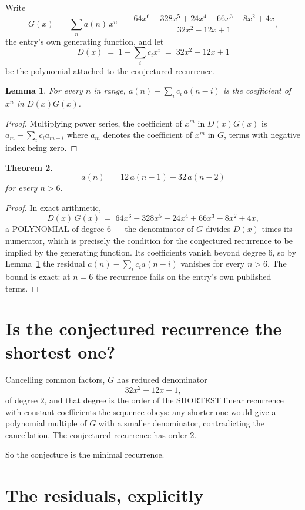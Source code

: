 \documentclass[11pt,a4paper]{article}
\theoremstyle{plain}
\newtheorem{theorem}{Theorem}
\newtheorem{lemma}[theorem]{Lemma}
\theoremstyle{definition}
\begin{document}
Write
\[
G(x)\;=\;\sum_{n}a(n)\,x^{n}\;=\;\frac{64 x^{6} - 328 x^{5} + 24 x^{4} + 66 x^{3} - 8 x^{2} + 4 x}{32 x^{2} - 12 x + 1},
\]
the entry's own generating function, and let
\[
D(x)\;=\;1-\sum_i c_i x^{i}\;=\;32 x^{2} - 12 x + 1
\]
be the polynomial attached to the conjectured recurrence.

\begin{lemma}\label{lem:key}
For every $n$ in range, $a(n)-\sum_i c_i\,a(n-i)$ is the coefficient of $x^{n}$ in
$D(x)G(x)$.
\end{lemma}

\begin{proof}
Multiplying power series, the coefficient of $x^{m}$ in $D(x)G(x)$ is
$a_m-\sum_i c_i a_{m-i}$ where $a_m$ denotes the coefficient of $x^{m}$ in $G$, terms with
negative index being zero.
\end{proof}

\begin{theorem}
\[
a(n)\;=\;12\,a(n-1) - 32\,a(n-2)
\]
for every $n>6$.
\end{theorem}

\begin{proof}
In exact arithmetic,
\[
D(x)\,G(x)\;=\;64 x^{6} - 328 x^{5} + 24 x^{4} + 66 x^{3} - 8 x^{2} + 4 x,
\]
a POLYNOMIAL of degree $6$ --- the denominator of $G$ divides $D(x)$ times its numerator,
which is precisely the condition for the conjectured recurrence to be implied by the
generating function. Its coefficients vanish beyond degree $6$, so by
Lemma~\ref{lem:key} the residual $a(n)-\sum_ic_ia(n-i)$ vanishes for every
$n>6$. The bound is exact: at $n=6$ the recurrence fails on the entry's own published terms.
\end{proof}

\section{Is the conjectured recurrence the shortest one?}

Cancelling common factors, $G$ has reduced denominator
\[
32 x^{2} - 12 x + 1,
\]
of degree $2$, and that degree is the order of the SHORTEST linear recurrence with
constant coefficients the sequence obeys: any shorter one would give a polynomial multiple of
$G$ with a smaller denominator, contradicting the cancellation. The conjectured recurrence has
order $2$.

So the conjecture is the minimal recurrence.

\section{The residuals, explicitly}
\end{document}
